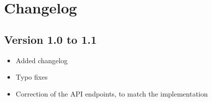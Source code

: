 \chapter{Changelog}
\section{Version 1.0 to 1.1}
\begin{itemize}
    \item Added changelog
    \item Typo fixes
    \item Correction of the API endpoints, to match the implementation
\end{itemize}
